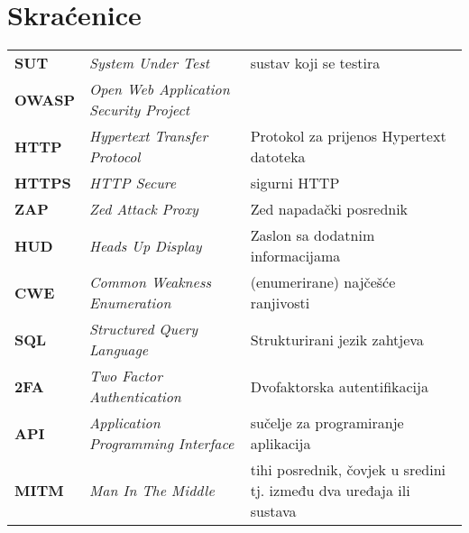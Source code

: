 \documentclass[utf8, seminar]{fer}
\begin{document}
\newpage
\chapter*{Skraćenice}
\renewcommand{\arraystretch}{2} %
\begin{tabularx}{\textwidth}{>{\bfseries}p{} >{\itshape}p{} p{}}
  SUT & System Under Test & sustav koji se testira \\
  OWASP & Open Web Application Security Project & \\
  HTTP & Hypertext Transfer Protocol & Protokol za prijenos Hypertext datoteka\\
  HTTPS & HTTP Secure & sigurni HTTP \\
  ZAP & Zed Attack Proxy & Zed napadački posrednik\\
  HUD & Heads Up Display & Zaslon sa dodatnim informacijama\\
  CWE & Common Weakness Enumeration & (enumerirane) najčešće ranjivosti \\
  SQL & Structured Query Language & Strukturirani jezik zahtjeva\\
  2FA & Two Factor Authentication & Dvofaktorska autentifikacija \\
  API & Application Programming Interface & sučelje za programiranje aplikacija\\
  MITM & Man In The Middle & tihi posrednik, čovjek u sredini tj. između dva uređaja ili sustava \\
\end{tabularx}
\end{document}

